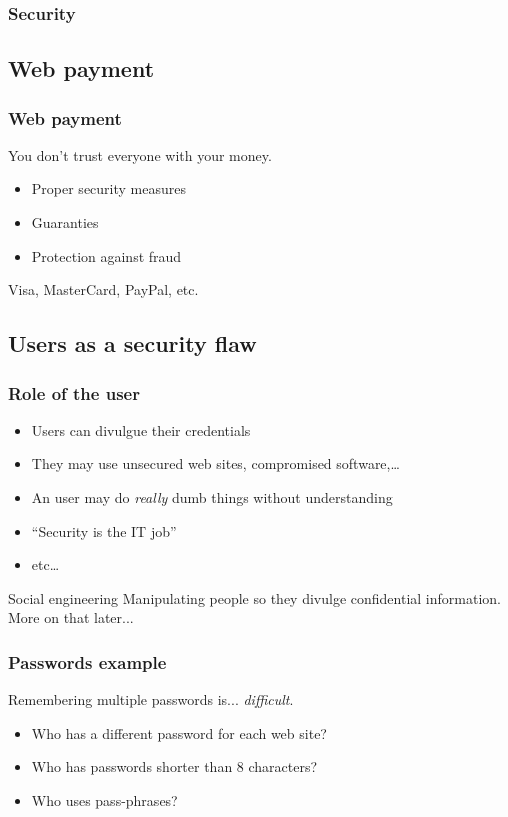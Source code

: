 \begin{frame}
\frametitle{Security}
\end{frame}

\subsection{Web payment}

\begin{frame}
\frametitle{Web payment}
\begin{center}
You don't trust everyone with your money.
\end{center}
\begin{itemize}
\item Proper security measures
\item Guaranties
\item Protection against fraud
\end{itemize}
\begin{example}
Visa, MasterCard, PayPal, etc.
\end{example}
\end{frame}

\subsection{Users as a security flaw}

\begin{frame}
\frametitle{Role of the user}
\begin{itemize}
\item Users can divulgue their credentials
\item They may use unsecured web sites, compromised software,\ldots
\item An user may do \emph{really} dumb things without understanding
\item ``Security is the IT job''
\item etc\ldots
\end{itemize}
\begin{block}{Social engineering}
Manipulating people so they divulge confidential information.
\\ More on that later...
\end{block}
\end{frame}

\begin{frame}
\frametitle{Passwords example}
Remembering multiple passwords is... \emph{difficult}.
\begin{itemize}
\item Who has a different password for each web site?
\item Who has passwords shorter than 8 characters?
\item Who uses pass-phrases?
\end{itemize}
\end{frame}

